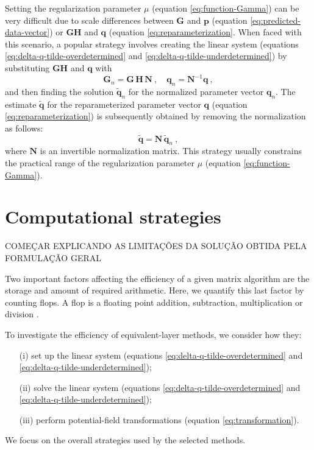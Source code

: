 Setting the regularization parameter $\mu$ (equation \ref{eq:function-Gamma}) can be very difficult due to scale differences
between $\mathbf{G}$ and $\mathbf{p}$ (equation \ref{eq:predicted-data-vector}) or $\mathbf{G}\mathbf{H}$ and $\mathbf{q}$
(equation \ref{eq:reparameterization}. 
When faced with this scenario, a popular strategy \cite[e.g.,][]{li-oldenburg_2010, soler-uieda2021}
involves creating the linear system (equations \ref{eq:delta-q-tilde-overdetermined} and 
\ref{eq:delta-q-tilde-underdetermined}) by substituting $\mathbf{G}\mathbf{H}$ and $\mathbf{q}$ with 
\begin{equation}
	\mathbf{G}_{n} = \mathbf{G} \, \mathbf{H} \, \mathbf{N} \: , \quad 
	\mathbf{q}_{n} = \mathbf{N}^{-1} \mathbf{q} \: ,
	\label{eq:normalization}
\end{equation}
and then finding the solution $\tilde{\mathbf{q}}_{n}$ for the normalized parameter vector $\mathbf{q}_{n}$.
The estimate $\tilde{\mathbf{q}}$ for the reparameterized parameter vector $\mathbf{q}$ (equation \ref{eq:reparameterization})
is subsequently obtained by removing the normalization as follows:
\begin{equation}
	\tilde{\mathbf{q}} = \mathbf{N} \, \tilde{\mathbf{q}}_{n} \: ,
	\label{eq:normalization-revome}
\end{equation}
where $\mathbf{N}$ is an invertible normalization matrix.
This strategy usually constrains the practical range of the regularization parameter $\mu$ (equation \ref{eq:function-Gamma}).

\section{Computational strategies}

COMEÇAR EXPLICANDO AS LIMITAÇÕES DA SOLUÇÃO OBTIDA PELA FORMULAÇÃO GERAL

Two important factors affecting the efficiency of a given matrix algorithm are the 
storage and amount of required arithmetic. Here, we quantify this last factor by counting flops.
A flop is a floating point addition, subtraction, multiplication or division \cite[][ p. 12--14]{golub-vanloan2013}.

To investigate the efficiency of equivalent-layer methods, we consider how they:
\begin{itemize}
	\item[(i)] set up the linear system (equations \ref{eq:delta-q-tilde-overdetermined} and \ref{eq:delta-q-tilde-underdetermined});
	\item[(ii)] solve the linear system (equations \ref{eq:delta-q-tilde-overdetermined} and \ref{eq:delta-q-tilde-underdetermined});
	\item[(iii)] perform potential-field transformations (equation \ref{eq:transformation}).
\end{itemize}
We focus on the overall strategies used by the selected methods.


